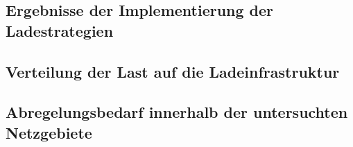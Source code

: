 \subsection{Ergebnisse der Implementierung der Ladestrategien}\label{chap:results_charging_strategies}


\subsection{Verteilung der Last auf die Ladeinfrastruktur}\label{chap:distribute_demand_ev}



\subsection{Abregelungsbedarf innerhalb der untersuchten Netzgebiete}

